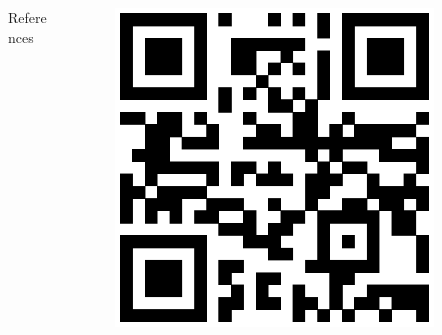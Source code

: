 \documentclass[final]{beamer}
\begin{document}
\begin{frame}[t]
\begin{columns}[t]
\begin{column}{.8\textwidth}
\begin{block}{References}
\begin{multicols}{2}
\begin{thebibliography}{9}
\end{thebibliography}
\end{multicols}
\vspace{-0.5cm}

\end{block}
\end{column}
\begin{column}{.14\textwidth} 

\begin{figure}
\includegraphics[width=0.95\textwidth]{mendez2019.eps}
\end{figure}

\end{column}
\begin{column}{.02\textwidth}
\end{column} %
\end{columns} 
\end{frame} %
\end{document}
